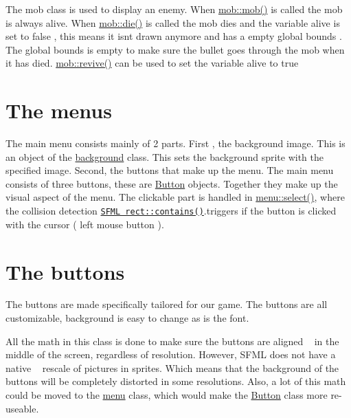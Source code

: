 The mob class is used to display an enemy. When \hyperlink{classmob_ac524dd40986df00721239b66c552437e}{mob\+::mob()} is called the mob is always alive. When \hyperlink{classmob_ae892b3ce84f4aa16411b385abb5410c8}{mob\+::die()} is called the mob dies and the variable alive is set to false , this means it isn\textquotesingle{}t drawn anymore and has a empty global bounds . The global bounds is empty to make sure the bullet goes through the mob when it has died. \hyperlink{classmob_a3bce6c06653881f8be86fbc60a2b67cb}{mob\+::revive()} can be used to set the variable alive to true\hypertarget{index_menu}{}\section{The menu\textquotesingle{}s}\label{index_menu}
The main menu consists mainly of 2 parts. First , the background image. This is an object of the \hyperlink{classbackground}{background} class. This sets the background sprite with the specified image. Second, the buttons that make up the menu. The main menu consists of three buttons, these are \hyperlink{class_button}{Button} objects. Together they make up the visual aspect of the menu. The clickable part is handled in \hyperlink{classmenu_a06744d58a2aad693d3637d0485aa7984}{menu\+::select()}, where the collision detection \href{https://www.sfml-dev.org/documentation/2.0/classsf_1_1Rect.php#aa8a5364c84de6dd5299f833b54e31ef1}{\tt S\+F\+ML rect\+::contains()}.triggers if the button is clicked with the cursor ( left mouse button ).\hypertarget{index_Button}{}\section{The buttons}\label{index_Button}
The buttons are made specifically tailored for our game. The buttons are all customizable, background is easy to change as is the font.

All the math in this class is done to make sure the buttons are aligned ~\newline
 in the middle of the screen, regardless of resolution. However, S\+F\+ML does not have a native ~\newline
 rescale of pictures in sprites. Which means that the background of the buttons will be completely distorted in some resolutions. Also, a lot of this math could be moved to the \hyperlink{classmenu}{menu} class, which would make the \hyperlink{class_button}{Button} class more re-\/useable. 